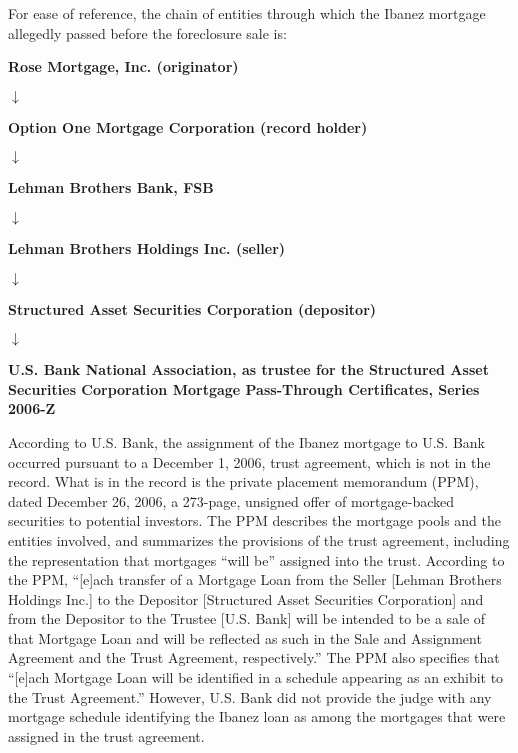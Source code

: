 For ease of reference, the chain of entities through which the Ibanez mortgage
allegedly passed before the foreclosure sale is:
\begin{center}
\textbf{Rose Mortgage, Inc. (originator)}

$\downarrow$

\textbf{Option One Mortgage Corporation (record holder)}

$\downarrow$

\textbf{Lehman Brothers Bank, FSB}

$\downarrow$

\textbf{Lehman Brothers Holdings Inc. (seller)}

$\downarrow$

\textbf{Structured Asset Securities Corporation (depositor)}

$\downarrow$

\textbf{U.S. Bank National Association, as trustee for the Structured Asset
Securities Corporation Mortgage Pass-Through Certificates, Series 2006-Z}
\end{center}
According to U.S. Bank, the assignment of the Ibanez mortgage to U.S. Bank
occurred pursuant to a December 1, 2006, trust agreement, which is not in the
record. What is in the record is the private placement memorandum (PPM), dated
December 26, 2006, a 273-page, unsigned offer of mortgage-backed securities to
potential investors. The PPM describes the mortgage pools and the entities
involved, and summarizes the provisions of the trust agreement, including the
representation that mortgages ``will be'' assigned into the trust. According to
the PPM, ``[e]ach transfer of a Mortgage Loan from the Seller [Lehman Brothers
Holdings Inc.] to the Depositor [Structured Asset Securities Corporation] and
from the Depositor to the Trustee [U.S. Bank] will be intended to be a sale of
that Mortgage Loan and will be reflected as such in the Sale and Assignment
Agreement and the Trust Agreement, respectively.'' The PPM also specifies that
``[e]ach Mortgage Loan will be identified in a schedule appearing as an exhibit
to the Trust Agreement.'' However, U.S. Bank did not provide the judge with any
mortgage schedule identifying the Ibanez loan as among the mortgages that were
assigned in the trust agreement.

